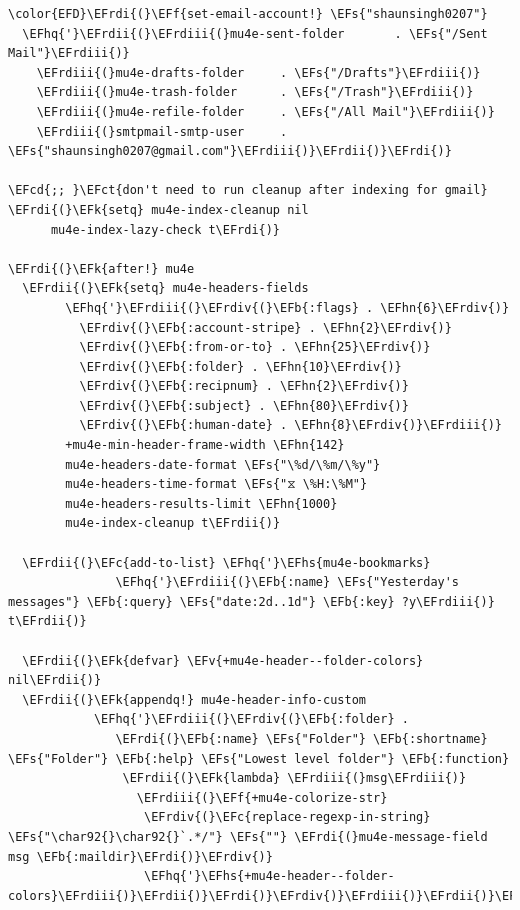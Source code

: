 \documentclass{scrartcl}
\newcommand{\EFk}[1]{\textcolor{EFk}{#1}} %
\newcommand{\EFs}[1]{\textcolor{EFs}{#1}} %
\newcommand{\EFb}[1]{\textcolor{EFb}{#1}} %
\newcommand{\EFct}[1]{\textcolor{EFct}{#1}} %
\newcommand{\EFc}[1]{\textcolor{EFc}{#1}} %
\newcommand{\EFv}[1]{\textcolor{EFv}{#1}} %
\newcommand{\EFf}[1]{\textcolor{EFf}{#1}} %
\newcommand{\EFcd}[1]{\textcolor{EFcd}{#1}} %
\newcommand{\EFhn}[1]{#1} %
\newcommand{\EFhq}[1]{#1} %
\newcommand{\EFhs}[1]{#1} %
\newcommand{\EFrdi}[1]{#1} %
\newcommand{\EFrdii}[1]{#1} %
\newcommand{\EFrdiii}[1]{#1} %
\newcommand{\EFrdiv}[1]{#1} %
\begin{document}
\begin{Code}
\begin{Verbatim}[]
\color{EFD}\EFrdi{(}\EFf{set-email-account!} \EFs{"shaunsingh0207"}
  \EFhq{'}\EFrdii{(}\EFrdiii{(}mu4e-sent-folder       . \EFs{"/Sent Mail"}\EFrdiii{)}
    \EFrdiii{(}mu4e-drafts-folder     . \EFs{"/Drafts"}\EFrdiii{)}
    \EFrdiii{(}mu4e-trash-folder      . \EFs{"/Trash"}\EFrdiii{)}
    \EFrdiii{(}mu4e-refile-folder     . \EFs{"/All Mail"}\EFrdiii{)}
    \EFrdiii{(}smtpmail-smtp-user     . \EFs{"shaunsingh0207@gmail.com"}\EFrdiii{)}\EFrdii{)}\EFrdi{)}

\EFcd{;; }\EFct{don't need to run cleanup after indexing for gmail}
\EFrdi{(}\EFk{setq} mu4e-index-cleanup nil
      mu4e-index-lazy-check t\EFrdi{)}

\EFrdi{(}\EFk{after!} mu4e
  \EFrdii{(}\EFk{setq} mu4e-headers-fields
        \EFhq{'}\EFrdiii{(}\EFrdiv{(}\EFb{:flags} . \EFhn{6}\EFrdiv{)}
          \EFrdiv{(}\EFb{:account-stripe} . \EFhn{2}\EFrdiv{)}
          \EFrdiv{(}\EFb{:from-or-to} . \EFhn{25}\EFrdiv{)}
          \EFrdiv{(}\EFb{:folder} . \EFhn{10}\EFrdiv{)}
          \EFrdiv{(}\EFb{:recipnum} . \EFhn{2}\EFrdiv{)}
          \EFrdiv{(}\EFb{:subject} . \EFhn{80}\EFrdiv{)}
          \EFrdiv{(}\EFb{:human-date} . \EFhn{8}\EFrdiv{)}\EFrdiii{)}
        +mu4e-min-header-frame-width \EFhn{142}
        mu4e-headers-date-format \EFs{"\%d/\%m/\%y"}
        mu4e-headers-time-format \EFs{"⧖ \%H:\%M"}
        mu4e-headers-results-limit \EFhn{1000}
        mu4e-index-cleanup t\EFrdii{)}

  \EFrdii{(}\EFc{add-to-list} \EFhq{'}\EFhs{mu4e-bookmarks}
               \EFhq{'}\EFrdiii{(}\EFb{:name} \EFs{"Yesterday's messages"} \EFb{:query} \EFs{"date:2d..1d"} \EFb{:key} ?y\EFrdiii{)} t\EFrdii{)}

  \EFrdii{(}\EFk{defvar} \EFv{+mu4e-header--folder-colors} nil\EFrdii{)}
  \EFrdii{(}\EFk{appendq!} mu4e-header-info-custom
            \EFhq{'}\EFrdiii{(}\EFrdiv{(}\EFb{:folder} .
               \EFrdi{(}\EFb{:name} \EFs{"Folder"} \EFb{:shortname} \EFs{"Folder"} \EFb{:help} \EFs{"Lowest level folder"} \EFb{:function}
                \EFrdii{(}\EFk{lambda} \EFrdiii{(}msg\EFrdiii{)}
                  \EFrdiii{(}\EFf{+mu4e-colorize-str}
                   \EFrdiv{(}\EFc{replace-regexp-in-string} \EFs{"\char92{}\char92{}`.*/"} \EFs{""} \EFrdi{(}mu4e-message-field msg \EFb{:maildir}\EFrdi{)}\EFrdiv{)}
                   \EFhq{'}\EFhs{+mu4e-header--folder-colors}\EFrdiii{)}\EFrdii{)}\EFrdi{)}\EFrdiv{)}\EFrdiii{)}\EFrdii{)}\EFrdi{)}
\end{Verbatim}
\end{Code}
\end{document}
